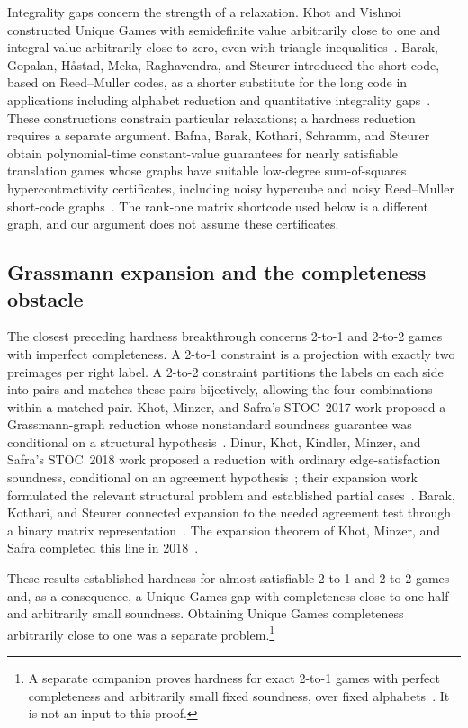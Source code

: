 Integrality gaps concern the strength of a relaxation. Khot and Vishnoi
constructed Unique Games with semidefinite value arbitrarily close to
one and integral value arbitrarily close to zero, even with triangle
inequalities~\cite{KV15}. Barak, Gopalan, H\aa stad, Meka, Raghavendra,
and Steurer introduced the short code, based on Reed--Muller codes, as a
shorter substitute for the long code in applications including alphabet
reduction and quantitative integrality gaps~\cite{BGHMRS15}. These constructions constrain particular
relaxations; a hardness reduction requires a separate argument.
Bafna, Barak, Kothari, Schramm, and Steurer obtain polynomial-time
constant-value guarantees for nearly satisfiable translation games
whose graphs have suitable low-degree sum-of-squares hypercontractivity
certificates, including noisy hypercube and noisy Reed--Muller short-code
graphs~\cite{BBKSS21}. The rank-one matrix shortcode used below is a
different graph, and our argument does not assume these certificates.

\subsection{Grassmann expansion and the completeness obstacle}

The closest preceding hardness breakthrough concerns 2-to-1 and
2-to-2 games with imperfect completeness. A 2-to-1 constraint is a
projection with exactly two preimages per right label. A 2-to-2
constraint partitions the labels on each side into pairs and matches
these pairs bijectively, allowing the four combinations within a
matched pair. Khot, Minzer, and Safra's STOC~2017 work proposed a
Grassmann-graph reduction whose nonstandard soundness guarantee was
conditional on a structural hypothesis~\cite{KMS17}. Dinur, Khot,
Kindler, Minzer, and Safra's STOC~2018 work proposed a reduction with
ordinary edge-satisfaction soundness, conditional on an agreement
hypothesis~\cite{DKKMS25}; their expansion work formulated the relevant
structural problem and established partial cases~\cite{DKKMS21Expansion}.
Barak, Kothari, and Steurer connected expansion to the needed agreement
test through a binary matrix representation~\cite{BKS18}. The expansion
theorem of Khot, Minzer, and Safra completed this line in
2018~\cite{KMS23}.

These results established hardness for almost satisfiable 2-to-1 and
2-to-2 games and, as a consequence, a Unique Games gap with completeness
close to one half and arbitrarily small soundness. Obtaining Unique
Games completeness arbitrarily close to one was a separate problem.\footnote{A
separate companion proves hardness for exact 2-to-1 games with perfect
completeness and arbitrarily small fixed soundness, over fixed
alphabets~\cite[Theorem~1.1]{OpenAIPerfectTwoToOne2026}. It is not an input
to this proof.}


